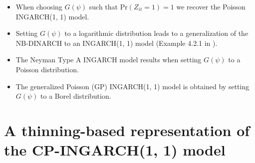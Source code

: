 \documentclass[review]{elsarticle}
\begin{document}
\begin{itemize}
\item When choosing $G(\psi)$ such that $\text{Pr}(Z_{it} = 1) = 1$ we recover the Poisson INGARCH(1, 1) model.
\item Setting $G(\psi)$ to a logarithmic distribution %
leads to a generalization of the NB-DINARCH \cite{Xu2012} to an INGARCH(1, 1) model (Example 4.2.1 in \cite{Weiss2018}). %
\item The Neyman Type A INGARCH model \cite{Goncalves2015a} results when setting $G(\psi)$ to a Poisson distribution. %
\item The generalized Poisson (GP) INGARCH(1, 1) model \cite{Zhu2012} is obtained by setting $G(\psi)$ to a Borel distribution. %
\end{itemize}

\section{A thinning-based representation of the CP-INGARCH(1, 1) model}
\label{sec:alternative_formulation}
\end{document}
